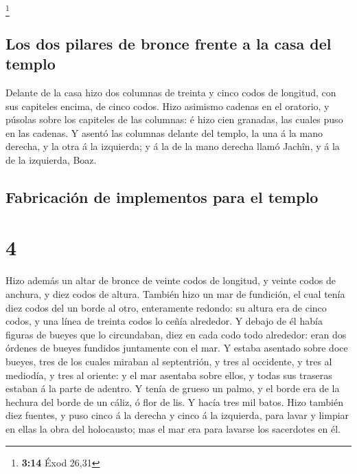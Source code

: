 \footnote{\textbf{3:14} Éxod 26,31}

\hypertarget{los-dos-pilares-de-bronce-frente-a-la-casa-del-templo}{%
\subsection{Los dos pilares de bronce frente a la casa del
templo}\label{los-dos-pilares-de-bronce-frente-a-la-casa-del-templo}}

 Delante de la casa hizo dos columnas de treinta y cinco
codos de longitud, con sus capiteles encima, de cinco codos.
 Hizo asimismo cadenas en el oratorio, y púsolas sobre los
capiteles de las columnas: é hizo cien granadas, las cuales puso en las
cadenas.  Y asentó las columnas delante del templo, la una
á la mano derecha, y la otra á la izquierda; y á la de la mano derecha
llamó Jachîn, y á la de la izquierda, Boaz.

\hypertarget{fabricaciuxf3n-de-implementos-para-el-templo}{%
\subsection{Fabricación de implementos para el
templo}\label{fabricaciuxf3n-de-implementos-para-el-templo}}

\hypertarget{section-3}{%
\section{4}\label{section-3}}

 Hizo además un altar de bronce de veinte codos de longitud,
y veinte codos de anchura, y diez codos de altura.  También
hizo un mar de fundición, el cual tenía diez codos del un borde al otro,
enteramente redondo: su altura era de cinco codos, y una línea de
treinta codos lo ceñía alrededor.  Y debajo de él había
figuras de bueyes que lo circundaban, diez en cada codo todo alrededor:
eran dos órdenes de bueyes fundidos juntamente con el mar. 
Y estaba asentado sobre doce bueyes, tres de los cuales miraban al
septentrión, y tres al occidente, y tres al mediodía, y tres al oriente:
y el mar asentaba sobre ellos, y todas sus traseras estaban á la parte
de adentro.  Y tenía de grueso un palmo, y el borde era de
la hechura del borde de un cáliz, ó flor de lis. Y hacía tres mil batos.
 Hizo también diez fuentes, y puso cinco á la derecha y
cinco á la izquierda, para lavar y limpiar en ellas la obra del
holocausto; mas el mar era para lavarse los sacerdotes en él.

